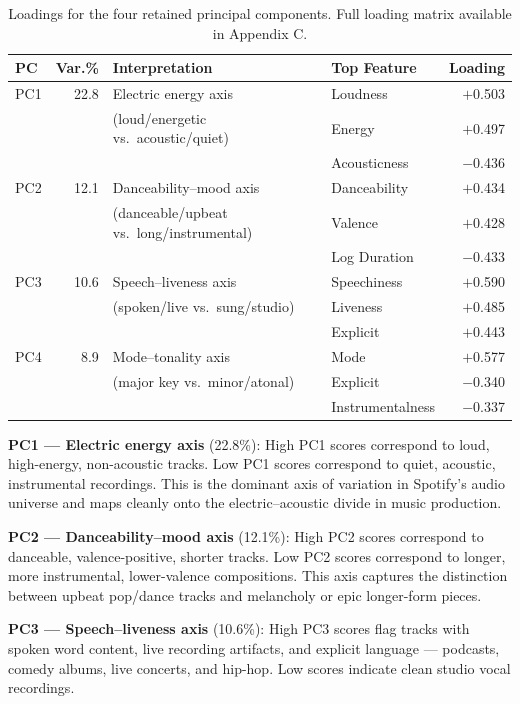 \documentclass[12pt, oneside]{book}
\begin{document}
\begin{table}[H]
\centering
\caption{Loadings for the four retained principal components. Full loading matrix available in Appendix C.}
\label{tab:ch12_loadings}
\begin{tabular}{lrllr}
\toprule
\textbf{PC} & \textbf{Var.\%} & \textbf{Interpretation} & \textbf{Top Feature} & \textbf{Loading} \\
\midrule
PC1 & 22.8 & Electric energy axis & Loudness        & $+$0.503 \\
    &      & (loud/energetic vs.\ acoustic/quiet) & Energy & $+$0.497 \\
    &      & & Acousticness     & $-$0.436 \\
\midrule
PC2 & 12.1 & Danceability--mood axis & Danceability  & $+$0.434 \\
    &      & (danceable/upbeat vs.\ long/instrumental) & Valence & $+$0.428 \\
    &      & & Log Duration     & $-$0.433 \\
\midrule
PC3 & 10.6 & Speech--liveness axis & Speechiness    & $+$0.590 \\
    &      & (spoken/live vs.\ sung/studio) & Liveness  & $+$0.485 \\
    &      & & Explicit         & $+$0.443 \\
\midrule
PC4 &  8.9 & Mode--tonality axis & Mode            & $+$0.577 \\
    &      & (major key vs.\ minor/atonal) & Explicit & $-$0.340 \\
    &      & & Instrumentalness & $-$0.337 \\
\bottomrule
\end{tabular}
\end{table}
 
\textbf{PC1 --- Electric energy axis} (22.8\%): High PC1 scores correspond to loud, high-energy, non-acoustic tracks. Low PC1 scores correspond to quiet, acoustic, instrumental recordings. This is the dominant axis of variation in Spotify's audio universe and maps cleanly onto the electric--acoustic divide in music production.
 
\textbf{PC2 --- Danceability--mood axis} (12.1\%): High PC2 scores correspond to danceable, valence-positive, shorter tracks. Low PC2 scores correspond to longer, more instrumental, lower-valence compositions. This axis captures the distinction between upbeat pop/dance tracks and melancholy or epic longer-form pieces.
 
\textbf{PC3 --- Speech--liveness axis} (10.6\%): High PC3 scores flag tracks with spoken word content, live recording artifacts, and explicit language --- podcasts, comedy albums, live concerts, and hip-hop. Low scores indicate clean studio vocal recordings.
 
\end{document}
